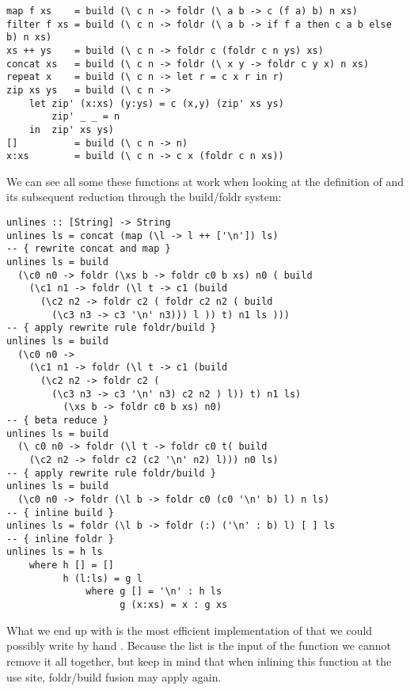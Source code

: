 \begin{listing}[H]
\begin{verbatim}
map f xs    = build (\ c n -> foldr (\ a b -> c (f a) b) n xs)
filter f xs = build (\ c n -> foldr (\ a b -> if f a then c a b else b) n xs)
xs ++ ys    = build (\ c n -> foldr c (foldr c n ys) xs)
concat xs   = build (\ c n -> foldr (\ x y -> foldr c y x) n xs)
repeat x    = build (\ c n -> let r = c x r in r)
zip xs ys   = build (\ c n -> 
    let zip' (x:xs) (y:ys) = c (x,y) (zip' xs ys)
        zip' _ _ = n
    in  zip' xs ys)
[]          = build (\ c n -> n)
x:xs        = build (\ c n -> c x (foldr c n xs))
\end{verbatim}
\end{listing}

We can see all some these functions at work when looking at the definition of  and its subsequent
reduction through the build/foldr system:

\begin{listing}[H]
\begin{verbatim}
unlines :: [String] -> String
unlines ls = concat (map (\l -> l ++ ['\n']) ls)
-- { rewrite concat and map }
unlines ls = build
  (\c0 n0 -> foldr (\xs b -> foldr c0 b xs) n0 ( build
    (\c1 n1 -> foldr (\l t -> c1 (build
      (\c2 n2 -> foldr c2 ( foldr c2 n2 ( build
        (\c3 n3 -> c3 '\n' n3))) l )) t) n1 ls )))
-- { apply rewrite rule foldr/build }
unlines ls = build
  (\c0 n0 ->
    (\c1 n1 -> foldr (\l t -> c1 (build
      (\c2 n2 -> foldr c2 (
        (\c3 n3 -> c3 '\n' n3) c2 n2 ) l)) t) n1 ls)
          (\xs b -> foldr c0 b xs) n0)
-- { beta reduce }
unlines ls = build
  (\ c0 n0 -> foldr (\l t -> foldr c0 t( build
    (\c2 n2 -> foldr c2 (c2 '\n' n2) l))) n0 ls)
-- { apply rewrite rule foldr/build }
unlines ls = build
  (\c0 n0 -> foldr (\l b -> foldr c0 (c0 '\n' b) l) n ls)
-- { inline build }
unlines ls = foldr (\l b -> foldr (:) ('\n' : b) l) [ ] ls
-- { inline foldr }
unlines ls = h ls
    where h [] = []
          h (l:ls) = g l
              where g [] = '\n' : h ls
                    g (x:xs) = x : g xs
\end{verbatim}
\end{listing}

What we end up with is the most efficient implementation of  that we could possibly write by hand \cite{shortcut_fusion}.
Because the list  is the input of the function we cannot remove it all together, but keep in mind that when inlining this function
at the use site, foldr/build fusion may apply again. 

